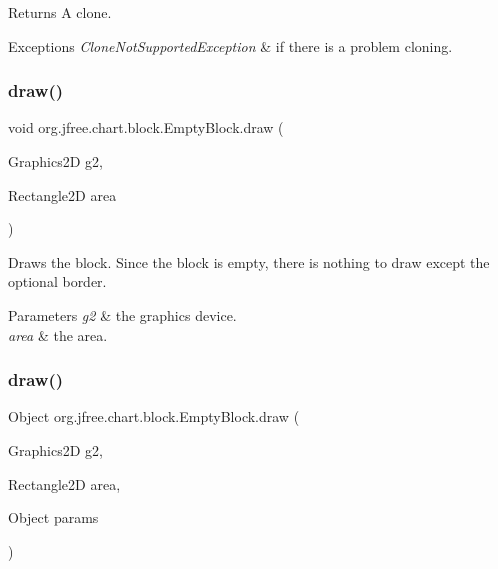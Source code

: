 \begin{DoxyReturn}{Returns}
A clone.
\end{DoxyReturn}

\begin{DoxyExceptions}{Exceptions}
{\em Clone\+Not\+Supported\+Exception} & if there is a problem cloning. \\
\hline
\end{DoxyExceptions}
\mbox{\label{classorg_1_1jfree_1_1chart_1_1block_1_1_empty_block_aaf87837a66c602c1b5c0e8af743932a0}} 
\subsubsection{\texorpdfstring{draw()}{draw()}\hspace{0.1cm}{\footnotesize\ttfamily [1/2]}}
{\footnotesize\ttfamily void org.\+jfree.\+chart.\+block.\+Empty\+Block.\+draw (\begin{DoxyParamCaption}\item[{Graphics2D}]{g2,  }\item[{Rectangle2D}]{area }\end{DoxyParamCaption})}

Draws the block. Since the block is empty, there is nothing to draw except the optional border.


\begin{DoxyParams}{Parameters}
{\em g2} & the graphics device. \\
\hline
{\em area} & the area. \\
\hline
\end{DoxyParams}
\mbox{\label{classorg_1_1jfree_1_1chart_1_1block_1_1_empty_block_a0b6a2e4523859ae8787ad8ca0221ec47}} 
\subsubsection{\texorpdfstring{draw()}{draw()}\hspace{0.1cm}{\footnotesize\ttfamily [2/2]}}
{\footnotesize\ttfamily Object org.\+jfree.\+chart.\+block.\+Empty\+Block.\+draw (\begin{DoxyParamCaption}\item[{Graphics2D}]{g2,  }\item[{Rectangle2D}]{area,  }\item[{Object}]{params }\end{DoxyParamCaption})}


